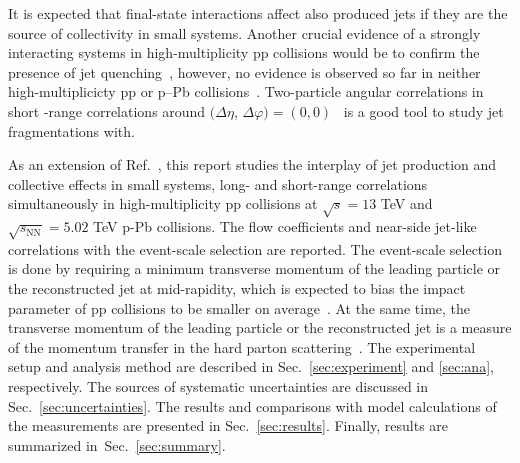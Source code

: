 It is expected that final-state interactions affect also produced jets if they are the source of collectivity in small systems. Another crucial evidence of a strongly interacting systems in high-multiplicity pp collisions would be to confirm the presence of jet quenching~\cite{Gyulassy:1990ye,Wang:1991xy}, however, no evidence is observed so far in neither high-multiplicicty pp or p--Pb collisions~\cite{Khachatryan:2016odn,Adam:2016jfp,Adam:2016dau,Acharya:2017okq}. Two-particle angular correlations in short -range correlations around $(\Delta\eta$, $\Delta\varphi)=(0,0)$~\cite{Adam:2016tsv} is a good tool to study jet fragmentations with. 

As an extension of Ref.~\cite{ALICE:2021nir}, this report studies the interplay of jet production and collective effects in small systems, long- and short-range correlations simultaneously in high-multiplicity pp collisions at $\sqrt{s} =13$ TeV and $\sqrt{s_{\mathrm{NN}}}=5.02$ TeV p-Pb collisions. 
The flow coefficients and near-side jet-like correlations with the event-scale selection are reported. The event-scale selection is done by requiring a minimum transverse momentum of the leading particle or the reconstructed jet at mid-rapidity, which is expected to bias the impact parameter of pp collisions to be smaller on average~\cite{Sjostrand:1986ep,Frankfurt:2010ea}. At the same time, the transverse momentum of the leading particle or the reconstructed jet is a measure of the momentum transfer in the hard parton scattering~\cite{Chatrchyan:2012tt,Chatrchyan:2011id}.
The experimental setup and analysis method are described in Sec.~\ref{sec:experiment} and \ref{sec:ana}, respectively. The sources of systematic uncertainties are discussed in Sec.~\ref{sec:uncertainties}. The results and comparisons with model calculations of the measurements are presented in Sec.~\ref{sec:results}. Finally, results are summarized in~Sec.~\ref{sec:summary}.

 